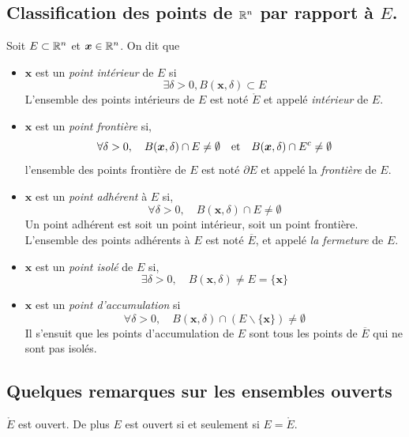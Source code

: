 \subsection{Classification des points de $\mathbb{R}^n$ par rapport à $E$.}
\begin{definition}
	Soit $E \subset \mathbb{R}^n$ et $\bm x \in \mathbb{R}^n$. On dit que
	\begin{itemize}
		\item $\bm x$ est un \emph{point intérieur} de $E$ si
		\[
		\exists \delta > 0, B(\bm x, \delta ) \subset E
		\]
		L'ensemble des points intérieurs de $E$ est noté $\mathring E$ et appelé \emph{intérieur} de $E$.
		\item $\bm  x$ est un \emph{point frontière} si,
		\[
		\forall \delta > 0, \quad B(\bm x, \delta) \cap E \neq \emptyset \quad \text{et} \quad B(\bm x, \delta) \cap E^c \neq \emptyset
		\]
		l'ensemble des points frontière de $E$ est noté $\partial E$ et appelé la \emph{frontière} de $E$.
		\item $\bm x$ est un \emph{point adhérent} à $E$ si,
		\[
		\forall \delta > 0, \quad  B(\bm x, \delta) \cap E \neq \emptyset
		\]
		Un point adhérent est soit un point intérieur, soit un point frontière. L'ensemble des points adhérents à $E$ est noté $\overline E$, et appelé \emph{la fermeture} de $E$.
		\item $\bm x$ est un \emph{point isolé} de $E$ si,
		\[
		\exists \delta > 0, \quad B(\bm x, \delta) \neq E = \{ \bm x\}
		\]
		\item $\bm x$ est un \emph{point d'accumulation} si
		\[
		\forall \delta > 0, \quad B(\bm x, \delta) \cap (E \backslash \{\bm x\}) \neq \emptyset
		\]
		Il s'ensuit que les points d'accumulation de $E$ sont tous les points de $\overline E$ qui ne sont pas isolés.
	\end{itemize}
\end{definition}
\subsection{Quelques remarques sur les ensembles ouverts}
\begin{proposition}
	$\mathring E$ est ouvert. De plus $E$ est ouvert si et seulement si $E = \mathring E$.
\end{proposition}

